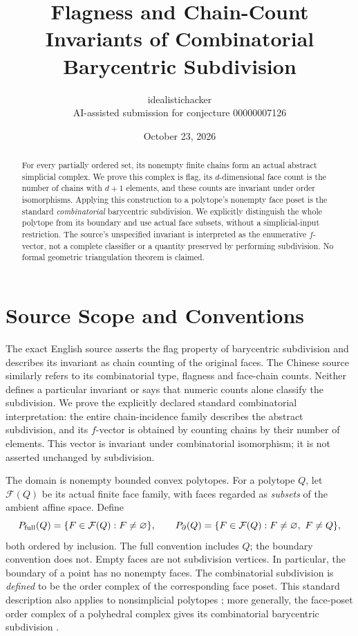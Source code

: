 \documentclass[11pt]{article}
\title{Flagness and Chain-Count Invariants\newline
  of Combinatorial Barycentric Subdivision}
\author{idealistichacker\\\small AI-assisted submission for conjecture 00000007126}
\date{October 23, 2026}
\begin{document}
\maketitle
\begin{abstract}
For every partially ordered set, its nonempty finite chains form an actual
abstract simplicial complex. We prove this complex is flag, its
$d$-dimensional face count is the number of chains with $d+1$ elements, and
these counts are invariant under order isomorphisms. Applying this construction
to a polytope's nonempty face poset is the standard \emph{combinatorial}
barycentric subdivision. We explicitly distinguish the whole polytope from its
boundary and use actual face subsets, without a simplicial-input restriction.
The source's unspecified invariant is interpreted as the enumerative
$f$-vector, not a complete classifier or a quantity preserved by performing
subdivision. No formal geometric triangulation theorem is claimed.
\end{abstract}

\section{Source Scope and Conventions}
The exact English source asserts the flag property of barycentric subdivision
and describes its invariant as chain counting of the original faces. The
Chinese source similarly refers to its combinatorial type, flagness and
face-chain counts. Neither defines a particular invariant or says that numeric
counts alone classify the subdivision. We prove the explicitly declared
standard combinatorial interpretation: the entire chain-incidence family
describes the abstract subdivision, and its $f$-vector is obtained by counting
chains by their number of elements. This vector is invariant under
combinatorial isomorphism; it is not asserted unchanged by subdivision.

The domain is nonempty bounded convex polytopes. For a polytope $Q$, let
$\mathcal F(Q)$ be its actual finite face family, with faces regarded as
\emph{subsets} of the ambient affine space. Define
\[
 P_{\rm full}(Q)=\{F\in\mathcal F(Q):F\ne\varnothing\},\qquad
 P_{\partial}(Q)=\{F\in\mathcal F(Q):F\ne\varnothing,\ F\ne Q\},
\]
both ordered by inclusion. The full convention includes $Q$; the boundary
convention does not. Empty faces are not subdivision vertices. In particular,
the boundary of a point has no nonempty faces. The combinatorial subdivision
is \emph{defined} to be the order complex of the corresponding face poset.
This standard description also applies to nonsimplicial polytopes
\cite[p.~11]{BW}; more generally, the face-poset order complex of a polyhedral
complex gives its combinatorial barycentric subdivision \cite[Section~2]{OS}.
\end{document}
